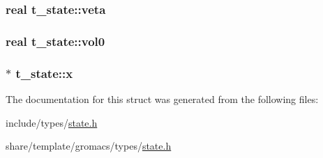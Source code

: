 \hypertarget{structt__state_ac87ef0747e2a870f11e2024ae273513c}{
\subsubsection[{veta}]{\setlength{\rightskip}{0pt plus 5cm}real {\bf t\-\_\-state\-::veta}}}\label{structt__state_ac87ef0747e2a870f11e2024ae273513c}
\hypertarget{structt__state_adb58dcb5d04fcc2d958d4882c0f9f966}{
\subsubsection[{vol0}]{\setlength{\rightskip}{0pt plus 5cm}real {\bf t\-\_\-state\-::vol0}}}\label{structt__state_adb58dcb5d04fcc2d958d4882c0f9f966}
\hypertarget{structt__state_a21e458daf6d4ca8c285116060e6d7a8e}{
\subsubsection[{x}]{ $\ast$ {\bf t\-\_\-state\-::x}}}\label{structt__state_a21e458daf6d4ca8c285116060e6d7a8e}


\-The documentation for this struct was generated from the following files\-:\begin{DoxyCompactItemize}
\item 
include/types/\hyperlink{include_2types_2state_8h}{state.\-h}\item 
share/template/gromacs/types/\hyperlink{share_2template_2gromacs_2types_2state_8h}{state.\-h}\end{DoxyCompactItemize}
